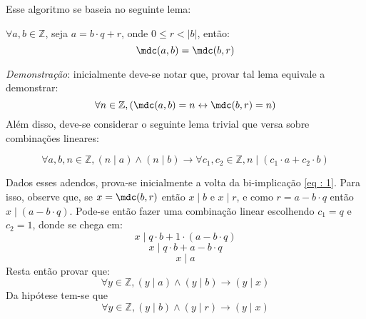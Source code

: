 \noindent
Esse algoritmo se baseia no seguinte lema:
\begin{lema} \label{lema:euclides}
    $\forall a, b \in \mathbb{Z}$, seja $a = b \cdot q  + r$, onde $0 \leq r < |b|$, então:
    \begin{equation*}
        \mdc(a, b) = \mdc(b, r)
    \end{equation*}
\end{lema}
\noindent
\textit{Demonstração}: inicialmente deve-se notar que, provar tal lema equivale a demonstrar:
        \begin{equation} \label{eq : 1}
            \forall n \in \mathbb{Z}, (\mdc(a, b) = n \leftrightarrow \mdc(b, r) = n)
        \end{equation}
        Além disso, deve-se considerar o seguinte lema trivial que versa sobre combinações lineares:
        \begin{lema}
            \begin{equation*}
                \forall a, b, n \in \mathbb{Z}, (n \mid a) \land (n \mid b) \rightarrow \forall c_1, c_2 \in \mathbb{Z}, n \mid (c_1 \cdot a + c_2 \cdot b)
            \end{equation*}
        \end{lema}
        Dados esses adendos, prova-se inicialmente a volta da bi-implicação \ref{eq : 1}. Para isso, observe que, se $x = \mdc(b, r)$ então $x \mid b$ e $x \mid r$, e como $r = a - b \cdot q$ então $x \mid (a - b \cdot q)$. Pode-se então fazer uma combinação linear escolhendo $c_1 = q$ e $c_2 = 1$, donde se chega em:
        \begin{equation*}
                x \mid q \cdot b + 1 \cdot (a - b \cdot q)
        \end{equation*}
        \begin{equation*}
                x \mid q \cdot b + a - b \cdot q
        \end{equation*}
        \begin{equation*}
                x \mid a
        \end{equation*}
        Resta então provar que:
        \begin{equation*}
            \forall y \in \mathbb{Z}, (y \mid a) \land (y \mid b) \rightarrow (y \mid x) 
        \end{equation*}
        Da hipótese tem-se que
        \begin{equation*}
            \forall y \in \mathbb{Z}, (y \mid b) \land (y \mid r) \rightarrow (y \mid x) 
        \end{equation*}
